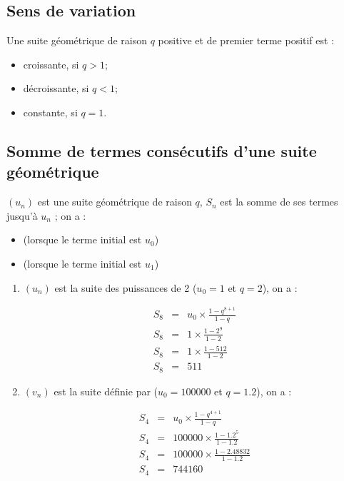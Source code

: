 \documentclass[12pt,a4paper]{article}
\begin{document}
\newpage 

\subsection{Sens de variation}

\begin{mybilan}
	Une suite géométrique de raison $q$ positive et de premier terme positif est :
	\begin{itemize}
		\item croissante, si $q > 1$;
		\item décroissante, si $q < 1$;
		\item constante, si $q = 1$.
	\end{itemize}
\end{mybilan}

\subsection{Somme de termes consécutifs d'une suite géométrique}

\begin{mybilan}
	 
	 $(u_n)$ est une suite géométrique de raison $q$, $S_n$ est la somme de ses termes jusqu'à $u_n$ ; on a :
	\begin{itemize}
		\item {} (lorsque le terme initial est $u_0$) 
		\item {} (lorsque le terme initial est $u_1$)
	\end{itemize}
\end{mybilan}

\begin{myexs}
	\begin{enumerate}
		\item $(u_n)$ est la suite des puissances de 2 ($u_0 = 1$ et $q = 2$), on a :
		
		\begin{eqnarray*}
			S_8 &=& u_0 \times \frac{1 - q^{8+1}}{1 - q} \\
			S_8 &=& 1 \times \frac{1 - 2^9}{1 - 2} \\
			S_8 &=& 1 \times \frac{1 - 512}{1 - 2} \\
			S_8 &=& 511
		\end{eqnarray*} 
	
		\item $(v_n)$ est la suite définie par ($u_0 = \num{100000}$ et $q = \num{1.2}$), on a :
		
		\begin{eqnarray*}
			S_4 &=& u_0 \times \frac{1 - q^{4+1}}{1 - q} \\
			S_4 &=& \num{100000} \times \frac{1 - \num{1.2}^5}{1 - \num{1.2}} \\
			S_4 &=& \num{100000} \times \frac{1 - \num{2.48832}}{1 - \num{1.2}} \\
			S_4 &=& \num{744160}
		\end{eqnarray*} 
	\end{enumerate}
\end{myexs}
\end{document}
